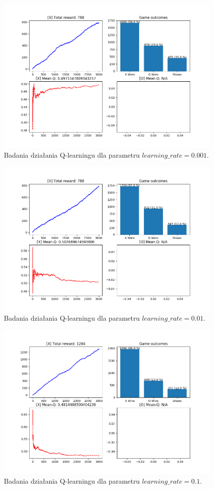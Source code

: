 \begin{figure}[H]
	\centering
	\includegraphics[width=0.7\linewidth]{imgs/q_learning/analysis/no_batch/lr/lr_0001}
	\caption{Badania działania Q-learningu dla parametru $learning\_rate = 0.001$.}
\end{figure}

\begin{figure}[H]
	\centering
	\includegraphics[width=0.7\linewidth]{imgs/q_learning/analysis/no_batch/lr/lr_001}
	\caption{Badania działania Q-learningu dla parametru $learning\_rate = 0.01$.}
\end{figure}

\begin{figure}[H]
	\centering
	\includegraphics[width=0.7\linewidth]{imgs/q_learning/analysis/no_batch/lr/lr_01}
	\caption{Badania działania Q-learningu dla parametru $learning\_rate = 0.1$.}
\end{figure}

